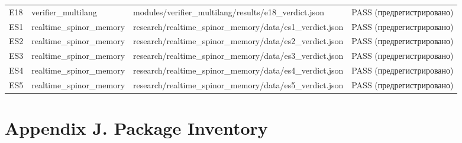 \documentclass[11pt,a4paper]{article}
\begin{document}
\begin{table}[htbp]
\begin{tabular}{p{} p{} p{} p{}}
E18 & verifier\_multilang & modules/verifier\_multilang/results/e18\_verdict.json & PASS (предрегистрировано) \\
ES1 & realtime\_spinor\_memory & research/realtime\_spinor\_memory/data/es1\_verdict.json & PASS (предрегистрировано) \\
ES2 & realtime\_spinor\_memory & research/realtime\_spinor\_memory/data/es2\_verdict.json & PASS (предрегистрировано) \\
ES3 & realtime\_spinor\_memory & research/realtime\_spinor\_memory/data/es3\_verdict.json & PASS (предрегистрировано) \\
ES4 & realtime\_spinor\_memory & research/realtime\_spinor\_memory/data/es4\_verdict.json & PASS (предрегистрировано) \\
ES5 & realtime\_spinor\_memory & research/realtime\_spinor\_memory/data/es5\_verdict.json & PASS (предрегистрировано) \\
\bottomrule
\end{tabular}
\end{table}

\section{Appendix J. Package Inventory}
\end{document}
